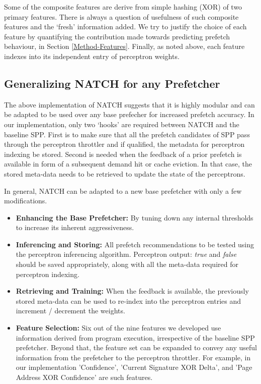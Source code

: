 Some of the composite features are derive from simple hashing (XOR) of
two primary features.  There is always a question of usefulness of
such composite features and the `fresh' information added.  We try to
justify the choice of each feature by quantifying the contribution
made towards predicting prefetch behaviour, in Section \ref{Method-Features}.  Finally,
as noted above, each feature indexes into its independent entry of
perceptron weights.

\subsection{Generalizing NATCH for any Prefetcher}
\label{Design-Generalizing}
The above implementation of NATCH suggests that it is highly modular and can be 
adapted to be used over any base prefecher for increased prefetch accuracy. 
In our implementation, 
only two `hooks' are required between NATCH and the baseline SPP. First  
is to make sure that all the prefetch candidates of SPP pass through 
the perceptron throttler and if qualified, the metadata for perceptron indexing
be stored. Second is needed when the feedback of a prior prefetch is available in form 
of a subsequent demand hit or cache eviction. In that case, the stored meta-data needs 
to be retrieved to update the state of the perceptrons.

In general, NATCH can be adapted to a new base prefetcher with only a few modifications.
\begin{itemize}

\item \textbf{Enhancing the Base Prefetcher:} By tuning down any internal thresholds 
to increase its inherent aggressiveness. 

\item \textbf{Inferencing and Storing:} All prefetch recommendations to be tested 
using the perceptron inferencing algorithm.
Perceptron output: \textit{true} and \textit{false} should be saved appropriately, along with all 
the meta-data required for perceptron indexing.

\item \textbf{Retrieving and Training:} When the feedback is available, the previously 
stored meta-data can be used to re-index into the perceptron entries and increment / decrement 
the weights.

\item \textbf{Feature Selection:} Six out of the nine features we developed use information derived 
from program execution, irrespective of the baseline SPP prefetcher. Beyond that, the feature set 
can be expanded to convey any useful information from the prefetcher to the perceptron throttler.
For example, in our implementation 'Confidence', 'Current Signature XOR Delta', and 
'Page Address XOR Confidence' are such features.

\end{itemize}

